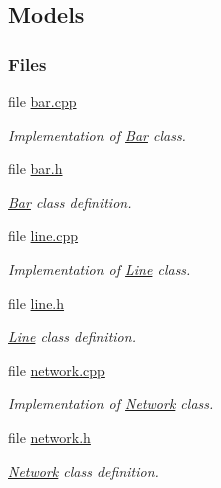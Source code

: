 \hypertarget{group___models}{}\subsection{Models}
\label{group___models}
\subsubsection*{Files}
\begin{DoxyCompactItemize}
\item 
file \hyperlink{bar_8cpp}{bar.\+cpp}
\begin{DoxyCompactList}\small\item\em Implementation of \hyperlink{class_bar}{Bar} class. \end{DoxyCompactList}\item 
file \hyperlink{bar_8h}{bar.\+h}
\begin{DoxyCompactList}\small\item\em \hyperlink{class_bar}{Bar} class definition. \end{DoxyCompactList}\item 
file \hyperlink{line_8cpp}{line.\+cpp}
\begin{DoxyCompactList}\small\item\em Implementation of \hyperlink{class_line}{Line} class. \end{DoxyCompactList}\item 
file \hyperlink{line_8h}{line.\+h}
\begin{DoxyCompactList}\small\item\em \hyperlink{class_line}{Line} class definition. \end{DoxyCompactList}\item 
file \hyperlink{network_8cpp}{network.\+cpp}
\begin{DoxyCompactList}\small\item\em Implementation of \hyperlink{class_network}{Network} class. \end{DoxyCompactList}\item 
file \hyperlink{network_8h}{network.\+h}
\begin{DoxyCompactList}\small\item\em \hyperlink{class_network}{Network} class definition. \end{DoxyCompactList}\end{DoxyCompactItemize}
